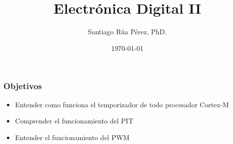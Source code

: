 \documentclass[10.5pt,scale=1.0,t,aspectratio=169,hyperref={pdfpagelabels=false}]{beamer}
\title{Electrónica Digital II}
\author{Santiago Rúa Pérez, PhD.}
\date{\today}
\begin{document}
	\begin{frame}
		\titlepage
	\end{frame}
	\frame{
		\begin{center}
			\LARGE \textcolor{blue}{TEMPORIZADORES}
		\end{center}
		
	}
	

\begin{frame}
\frametitle{Objetivos}
\begin{itemize}
\item Entender como funciona el temporizador de todo procesador Cortex-M
\item Comprender el funcionamiento del PIT
\item Entender el funcionamiento del PWM
\end{itemize}
\end{frame}
\end{document}
